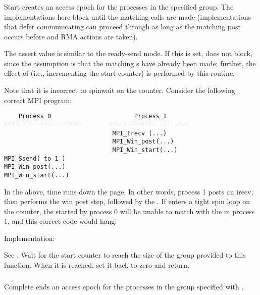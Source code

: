 \documentclass{article}
\begin{document}
\subsubsection{}
Start creates an access epoch for the processes in the specified group.  The
implementations here block until the matching  calls are
made (implementations that defer communicating can proceed through
 as long as the matching post occurs before and RMA
actions are taken).

The  assert value is similar to the ready-send
mode.  If this is set,  does not block, since the
assumption is that the matching s have already been
made; further, the effect of  (i.e., incrementing the
start counter) is performed by this routine.

Note that it is incorrect to spinwait on the counter.  Consider the following
correct MPI program:
\begin{verbatim}
    Process 0                       Process 1
---------------------        ----------------------
                              MPI_Irecv (...)
                              MPI_Win_post(...)
                              MPI_Win_start(...)
MPI_Ssend( to 1 )
MPI_Win_post(...)
MPI_Win_start(...)
\end{verbatim}
In the above, time runs down the page.  In other words, process 1 posts an
irecv, then performs the win post step, followed by the
.  If  enters a tight spin loop
on the counter, the  started by process 0 will be unable to
match with the  in process 1, and this correct code would
hang.  

Implementation:

See .  Wait for the start counter to reach the size of
the group provided to this function.  When it is reached, set it back to zero
and return.  


\subsubsection{}
Complete ends an access epoch for the processes in the group specified with
.
\end{document}
